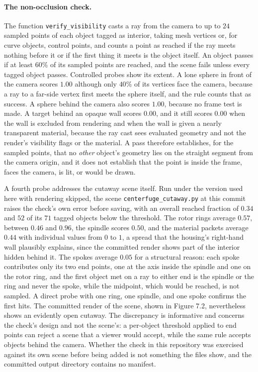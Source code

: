 \paragraph{The non-occlusion check.} The function \texttt{verify\_visibility} casts a ray from the camera to up to $24$ sampled points of each object tagged as interior, taking mesh vertices or, for curve objects, control points, and counts a point as reached if the ray meets nothing before it or if the first thing it meets is the object itself. An object passes if at least $60\%$ of its sampled points are reached, and the scene fails unless every tagged object passes. Controlled probes show its extent. A lone sphere in front of the camera scores $1.00$ although only $40\%$ of its vertices face the camera, because a ray to a far-side vertex first meets the sphere itself, and the rule counts that as success. A sphere behind the camera also scores $1.00$, because no frame test is made. A target behind an opaque wall scores $0.00$, and it still scores $0.00$ when the wall is excluded from rendering and when the wall is given a nearly transparent material, because the ray cast sees evaluated geometry and not the render's visibility flags or the material. A pass therefore establishes, for the sampled points, that no \emph{other} object's geometry lies on the straight segment from the camera origin, and it does not establish that the point is inside the frame, faces the camera, is lit, or would be drawn.

A fourth probe addresses the cutaway scene itself. Run under the version used here with rendering skipped, the scene \texttt{centerfuge\_cutaway.py} at this commit raises the check's own error before saving, with an overall reached fraction of $0.34$ and $52$ of its $71$ tagged objects below the threshold. The rotor rings average $0.57$, between $0.46$ and $0.96$, the spindle scores $0.50$, and the material packets average $0.44$ with individual values from $0$ to $1$, a spread that the housing's right-hand wall plausibly explains, since the committed render shows part of the interior hidden behind it. The spokes average $0.05$ for a structural reason: each spoke contributes only its two end points, one at the axis inside the spindle and one on the rotor ring, and the first object met on a ray to either end is the spindle or the ring and never the spoke, while the midpoint, which would be reached, is not sampled. A direct probe with one ring, one spindle, and one spoke confirms the first hits. The committed render of the scene, shown in Figure 7.2, nevertheless shows an evidently open cutaway. The discrepancy is informative and concerns the check's design and not the scene's: a per-object threshold applied to end points can reject a scene that a viewer would accept, while the same rule accepts objects behind the camera. Whether the check in this repository was exercised against its own scene before being added is not something the files show, and the committed output directory contains no manifest.

